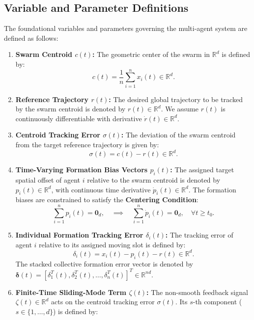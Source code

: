 \documentclass[11pt]{article}
\begin{document}
\subsection{Variable and Parameter Definitions}
The foundational variables and parameters governing the multi-agent system are defined as follows:
\begin{enumerate}
    \item \textbf{Swarm Centroid $c(t)$:} The geometric center of the swarm in $\mathbb{R}^d$ is defined by:
    \begin{equation}
    c(t) = \frac{1}{n}\sum_{i=1}^{n} x_i(t) \in \mathbb{R}^d.
    \end{equation}
    \item \textbf{Reference Trajectory $r(t)$:} The desired global trajectory to be tracked by the swarm centroid is denoted by $r(t) \in \mathbb{R}^d$. We assume $r(t)$ is continuously differentiable with derivative $\dot{r}(t) \in \mathbb{R}^d$.
    \item \textbf{Centroid Tracking Error $\sigma(t)$:} The deviation of the swarm centroid from the target reference trajectory is given by:
    \begin{equation}
    \sigma(t) = c(t) - r(t) \in \mathbb{R}^d.
    \end{equation}
    \item \textbf{Time-Varying Formation Bias Vectors $p_i(t)$:} The assigned target spatial offset of agent $i$ relative to the swarm centroid is denoted by $p_i(t) \in \mathbb{R}^d$, with continuous time derivative $\dot{p}_i(t) \in \mathbb{R}^d$. The formation biases are constrained to satisfy the \textbf{Centering Condition}:
    \begin{equation}
    \sum_{i=1}^{n} p_i(t) = \mathbf{0}_d, \quad \implies \quad \sum_{i=1}^{n} \dot{p}_i(t) = \mathbf{0}_d, \quad \forall t \ge t_0.
    \label{eq:centering_condition}
    \end{equation}
    \item \textbf{Individual Formation Tracking Error $\delta_i(t)$:} The tracking error of agent $i$ relative to its assigned moving slot is defined by:
    \begin{equation}
    \delta_i(t) = x_i(t) - p_i(t) - r(t) \in \mathbb{R}^d.
    \label{eq:delta_def}
    \end{equation}
    The stacked collective formation error vector is denoted by $\boldsymbol{\delta}(t) = [\delta_1^T(t), \delta_2^T(t), \dots, \delta_n^T(t)]^T \in \mathbb{R}^{nd}$.
    \item \textbf{Finite-Time Sliding-Mode Term $\zeta(t)$:} The non-smooth feedback signal $\zeta(t) \in \mathbb{R}^d$ acts on the centroid tracking error $\sigma(t)$. Its $s$-th component ($s \in \{1, \dots, d\}$) is defined by:

\end{enumerate}
\end{document}
